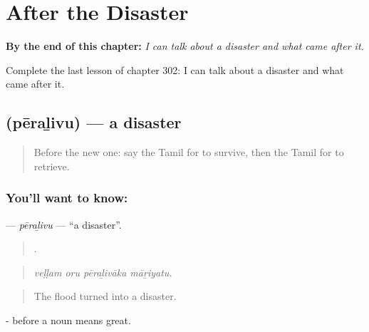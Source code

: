 
\chapter{After the Disaster}
\label{ch:ta-after-the-disaster}

\begin{chapteropening}
\textbf{By the end of this chapter:} \emph{I can talk about a disaster and what came after it.}

Complete the last lesson of chapter 302: I can talk about a disaster and what came after it.
\end{chapteropening}

\section[\texorpdfstring{\ta{பேரழிவு} (pēraḻivu)}{பேரழிவு (pēraḻivu)}]{ (pēraḻivu) — a disaster}

\label{lesson:TA-C302-peralivu}



\begin{quote}
Before the new one: say the Tamil for to survive, then the Tamil for to retrieve.
\end{quote}

\subsection*{You'll want to know: }
\textbf{} — \emph{pēraḻivu} — \textquotedblleft{}a disaster\textquotedblright{}.

\begin{quote}
   .
\end{quote}

\begin{quote}
\emph{veḷḷam oru pēraḻivāka māṟiyatu.}
\end{quote}

\begin{quote}
The flood turned into a disaster.
\end{quote}

- before a noun means great.

